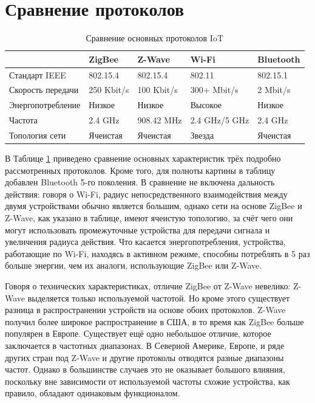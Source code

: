 	
	\section{Сравнение протоколов}
	
	\begin{table}[h]
		\centering
		\begin{tabular}{ | l | l | l | l | l | }
			\hline
			 & ZigBee & Z-Wave & Wi-Fi & Bluetooth \\ \hline
			Стандарт IEEE & 802.15.4 & 802.15.4 & 802.11 & 802.15.1 \\ \hline
			Скорость передачи & 250 Kbit/s & 100 Kbit/s & 300+ Mbit/s & 2 Mbit/s \\ \hline
			Энергопотребление & Низкое & Низкое & Высокое & Низкое \\ \hline
			Частота & 2.4 GHz  & 908.42 MHz & 2.4 GHz/5 GHz & 2.4 GHz \\ \hline
			Топология сети & Ячеистая & Ячеистая & Звезда & Ячеистая \\
			\hline
		\end{tabular}
		\caption{Сравнение основных протоколов IoT}
		\label{table-IoT-protocols-comparison}
	\end{table}

	В Таблице \ref{table-IoT-protocols-comparison} приведено сравнение основных характеристик трёх подробно 
	рассмотренных протоколов. Кроме того, для полноты картины в таблицу добавлен Bluetooth 5-го поколения.
	В сравнение не включена дальность действия: говоря о Wi-Fi, радиус непосредственного
	взаимодействия между двумя устройствами обычно является большим, однако сети на основе
	ZigBee и Z-Wave, как указано в таблице, имеют ячеистую топологию, за счёт чего они могут использовать
	промежуточные устройства для передачи сигнала и увеличения радиуса действия. Что касается 
	энергопотребления, устройства, работающие по Wi-Fi, находясь в активном режиме, способны потреблять
	в 5 раз больше энергии, чем их аналоги, использующие ZigBee или Z-Wave.
	
	Говоря о технических характеристиках, отличие ZigBee от Z-Wave невелико: Z-Wave выделяется только
	используемой частотой. Но кроме этого существует разница в распространении устройств на основе
	обоих протоколов. Z-Wave получил более широкое распространение в США, в то время как ZigBee больше
	популярен в Европе. Существует ещё одно небольшое отличие, которое заключается в частотных диапазонах. 
	В Северной Америке, 
	Европе, и ряде других стран под Z-Wave и другие протоколы отводятся разные диапазоны частот. Однако
	в большинстве случаев это не оказывает большого влияния, поскольку вне зависимости от используемой 
	частоты схожие устройства, как правило, обладают одинаковым функционалом.
	
